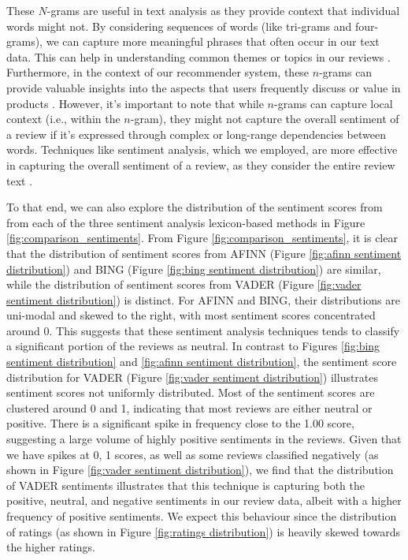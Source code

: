These $N$-grams are useful in text analysis as they provide context that individual words might not. By considering sequences of words (like tri-grams and four-grams), we can capture more meaningful phrases that often occur in our text data. This can help in understanding common themes or topics in our reviews \cite{collins2019document}. Furthermore, in the context of our recommender system, these $n$-grams can provide valuable insights into the aspects that users frequently discuss or value in products \cite{srifi2020recommender}. However, it’s important to note that while $n$-grams can capture local context (i.e., within the $n$-gram), they might not capture the overall sentiment of a review if it’s expressed through complex or long-range dependencies between words. Techniques like sentiment analysis, which we employed, are more effective in capturing the overall sentiment of a review, as they consider the entire review text \cite{collins2019document}.

To that end, we can also explore the distribution of the sentiment scores from from each of the three sentiment analysis lexicon-based methods in Figure \ref{fig:comparison_sentiments}. From Figure \ref{fig:comparison_sentiments}, it is clear that the distribution of sentiment scores from AFINN (Figure \ref{fig:afinn sentiment distribution}) and BING (Figure \ref{fig:bing sentiment distribution}) are similar, while the distribution of sentiment scores from VADER (Figure \ref{fig:vader sentiment distribution}) is distinct. For AFINN and BING, their distributions are uni-modal and skewed to the right, with most sentiment scores concentrated around 0. This suggests that these sentiment analysis techniques tends to classify a significant portion of the reviews as neutral. In contrast to Figures \ref{fig:bing sentiment distribution} and \ref{fig:afinn sentiment distribution}, the sentiment score distribution for VADER (Figure \ref{fig:vader sentiment distribution}) illustrates sentiment scores not uniformly distributed. Most of the sentiment scores are clustered around 0 and 1, indicating that most reviews are either neutral or positive. There is a significant spike in frequency close to the 1.00 score, suggesting a large volume of highly positive sentiments in the reviews. Given that we have spikes at 0, 1 scores, as well as some reviews classified negatively (as shown in Figure \ref{fig:vader sentiment distribution}), we find that the distribution of VADER sentiments illustrates that this technique is capturing both the positive, neutral, and negative sentiments in our review data, albeit with a higher frequency of positive sentiments. We expect this behaviour since the distribution of ratings (as shown in Figure \ref{fig:ratings distribution}) is heavily skewed towards the higher ratings.


